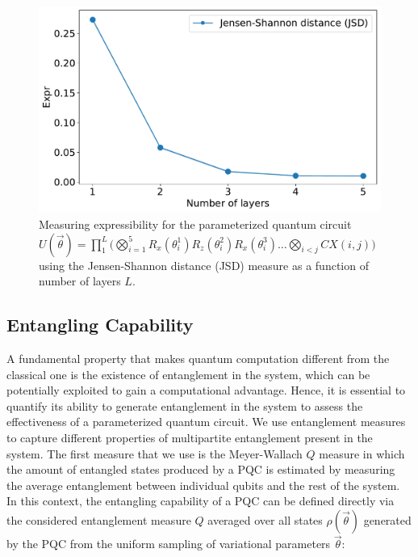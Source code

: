 \documentclass[%
 reprint,
 amsmath,
 amssymb,
 showkeys,
 pra,
 floatfix,
]{revtex4-2}
\begin{document}
\begin{figure}[!t]
    \centering
    \includegraphics[width=\linewidth]{images/expressibility-measure.pdf}
    \caption[Visualizing entanglement spectrum for parameterized quantum circuits]{Measuring expressibility for the parameterized quantum circuit $U(\vec{\theta}) =  \prod_{1}^{L}\big(\bigotimes_{i=1}^{5}R_x(\theta_i^1)R_z(\theta_i^2)R_x(\theta_i^3) \ldots \bigotimes_{i<j}CX(i, j)\big)$ using the Jensen-Shannon distance (JSD) measure as a function of number of layers $L$. }
    \label{fig:expressibility-measure}
\end{figure}

\subsection{Entangling Capability}

A fundamental property that makes quantum computation different from the classical one is the existence of entanglement in the system, which can be potentially exploited to gain a computational advantage. Hence, it is essential to quantify its ability to generate entanglement in the system to assess the effectiveness of a parameterized quantum circuit. We use entanglement measures to capture different properties of multipartite entanglement present in the system. The first measure that we use is the Meyer-Wallach $Q$ measure \cite{10.1002/qute.201900070, doi:10.1063/1.1497700} in which the amount of entangled states produced by a PQC is estimated by measuring the average entanglement between individual qubits and the rest of the system. In this context, the entangling capability of a PQC can be defined directly via the considered entanglement measure $Q$ averaged over all states $\rho(
\vec{\theta})$ generated by the PQC from the uniform sampling of variational parameters $\vec{\theta}$:
\end{document}
